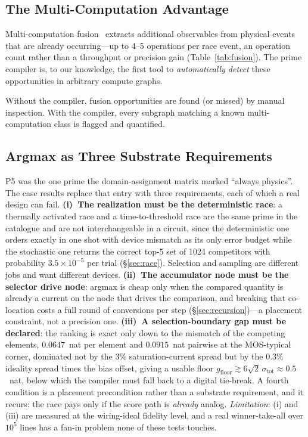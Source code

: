 \documentclass[11pt]{article}
\begin{document}
\subsection{The Multi-Computation Advantage}

Multi-computation fusion~\cite{bieg2026} extracts additional observables from physical events that are already occurring---up to 4--5 operations per race event, an operation count rather than a throughput or precision gain (Table~\ref{tab:fusion}). The prime compiler is, to our knowledge, the first tool to \textit{automatically detect} these opportunities in arbitrary compute graphs.

Without the compiler, fusion opportunities are found (or missed) by manual inspection. With the compiler, every subgraph matching a known multi-computation class is flagged and quantified.

\subsection{Argmax as Three Substrate Requirements}
\label{sec:argmax}

P5 was the one prime the domain-assignment matrix marked ``always physics''. The case results replace that entry with three requirements, each of which a real design can fail. \textbf{(i)~The realization must be the deterministic race}: a thermally activated race and a time-to-threshold race are the same prime in the catalogue and are not interchangeable in a circuit, since the deterministic one orders exactly in one shot with device mismatch as its only error budget while the stochastic one returns the correct top-5 set of 1024 competitors with probability $3.5\times10^{-5}$ per trial (\S\ref{sec:race}). Selection and sampling are different jobs and want different devices. \textbf{(ii)~The accumulator node must be the selector drive node}: argmax is cheap only when the compared quantity is already a current on the node that drives the comparison, and breaking that co-location costs a full round of conversions per step (\S\ref{sec:recursion})---a placement constraint, not a precision one. \textbf{(iii)~A selection-boundary gap must be declared}: the ranking is exact only down to the mismatch of the competing elements, $0.0647$~nat per element and $0.0915$~nat pairwise at the MOS-typical corner, dominated not by the $3\%$ saturation-current spread but by the $0.3\%$ ideality spread times the bias offset, giving a usable floor $g_{\mathrm{floor}} \gtrsim 6\sqrt2\,\sigma_{\mathrm{tot}} \approx 0.5$~nat, below which the compiler must fall back to a digital tie-break. A fourth condition is a placement precondition rather than a substrate requirement, and it recurs: the race pays only if the score path is \textit{already} analog. \textit{Limitation}: (i) and (iii) are measured at the wiring-ideal fidelity level, and a real winner-take-all over $10^5$ lines has a fan-in problem none of these tests touches.
\end{document}
